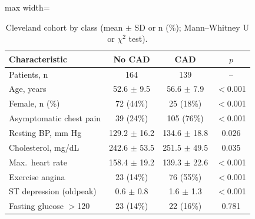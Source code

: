 \begin{table}[!t]
\centering
\scriptsize
\caption{Cleveland cohort by class (mean $\pm$ SD or n (\%); Mann--Whitney U or $\chi^2$ test).}
\label{tab:demo}
\setlength{\tabcolsep}{3pt}
\begin{adjustbox}{max width=\linewidth}
\begin{tabular}{lccc}
\toprule
Characteristic & No CAD & CAD & $p$ \\
\midrule
Patients, n & 164 & 139 & -- \\
Age, years & 52.6 $\pm$ 9.5 & 56.6 $\pm$ 7.9 & $<$0.001 \\
Female, n (\%) & 72 (44\%) & 25 (18\%) & $<$0.001 \\
Asymptomatic chest pain & 39 (24\%) & 105 (76\%) & $<$0.001 \\
Resting BP, mm Hg & 129.2 $\pm$ 16.2 & 134.6 $\pm$ 18.8 & 0.026 \\
Cholesterol, mg/dL & 242.6 $\pm$ 53.5 & 251.5 $\pm$ 49.5 & 0.035 \\
Max.\ heart rate & 158.4 $\pm$ 19.2 & 139.3 $\pm$ 22.6 & $<$0.001 \\
Exercise angina & 23 (14\%) & 76 (55\%) & $<$0.001 \\
ST depression (oldpeak) & 0.6 $\pm$ 0.8 & 1.6 $\pm$ 1.3 & $<$0.001 \\
Fasting glucose $>$120 & 23 (14\%) & 22 (16\%) & 0.781 \\
\bottomrule
\end{tabular}
\end{adjustbox}
\end{table}
